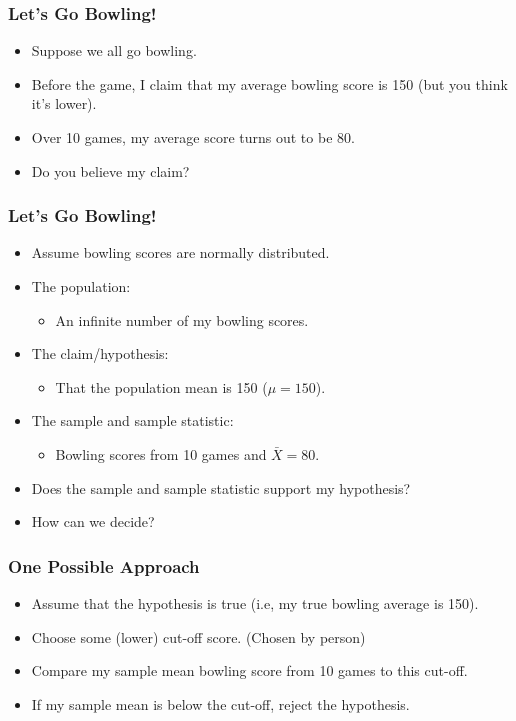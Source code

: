 \documentclass[12pt]{beamer}
\begin{document}
\begin{frame}
	\frametitle{\color{blue}Let's Go Bowling!}
	
	\begin{itemize}[label={\color{blue}$\blacktriangleright$}]
		\item Suppose we all go bowling.
		\item Before the game, I claim that my average bowling score is 150 (but you think it's lower).
		\item Over 10 games, my average score turns out to be 80.
		\item Do you believe my claim?
	\end{itemize}
	
\end{frame}
\begin{frame}
	\frametitle{\color{blue}Let's Go Bowling!}
	
	\begin{itemize}[label={\color{blue}$\blacktriangleright$}]
		\item Assume bowling scores are normally distributed.
		\item The population:
		\begin{itemize}
			\item An infinite number of my bowling scores.
		\end{itemize}
		\item The claim/hypothesis:
		\begin{itemize}
			\item That the population mean is 150 ($\mu = 150$).
		\end{itemize}
		\item The sample and sample statistic:
		\begin{itemize}
			\item Bowling scores from 10 games and $\bar{X} = 80$.
		\end{itemize}
		\item Does the sample and sample statistic support my hypothesis?
		\item How can we decide?
	\end{itemize}
	
\end{frame}

	
	\begin{frame}
		\frametitle{\color{blue}One Possible Approach}
		
		\begin{itemize}[label={\color{blue}$\blacktriangleright$}]
			\item Assume that the hypothesis is true (i.e, my true bowling average is 150).
			\item Choose some (lower) cut-off score. (Chosen by person)
			\item Compare my sample mean bowling score from 10 games to this cut-off.
			\item If my sample mean is below the cut-off, reject the hypothesis.
		\end{itemize}
		
	\end{frame}
	
\end{document}
